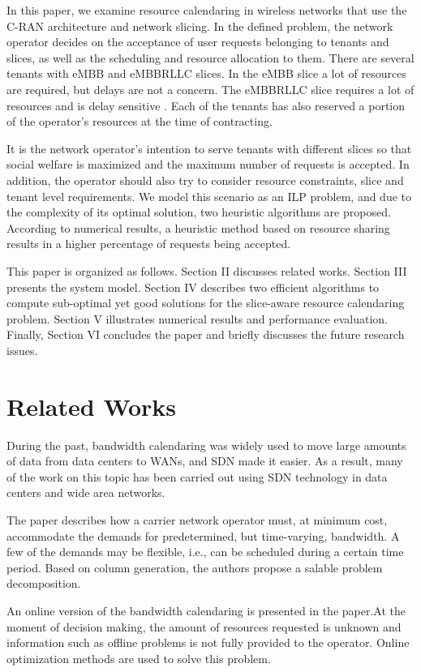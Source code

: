 \documentclass[conference]{IEEEtran}
\begin{document}
In this paper, we examine resource calendaring in wireless networks that use the C-RAN architecture and network slicing. In the defined problem, the network operator decides on the acceptance of user requests belonging to tenants and slices, as well as the scheduling and resource allocation to them. There are several tenants with eMBB and eMBBRLLC slices. In the eMBB slice a lot of resources are required, but delays are not a concern. The eMBBRLLC slice requires a lot of resources and is delay sensitive \cite{yazar20206g}. Each of the tenants has also reserved a portion of the operator's resources at the time of contracting.

It is the network operator's intention to serve tenants with different slices so that social welfare is maximized and the maximum number of requests is accepted. In addition, the operator should also try to consider resource constraints, slice and tenant level requirements. We model this scenario as an ILP problem, and due to the complexity of its optimal solution, two heuristic algorithms are proposed. According to numerical results, a heuristic method based on resource sharing results in a higher percentage of requests being accepted. 

This paper is organized as follows. Section II discusses related works. Section III presents the system model. Section IV describes two efficient algorithms to compute sub-optimal yet good solutions for the slice-aware resource calendaring problem. Section V illustrates numerical results and performance evaluation. Finally, Section VI concludes the paper and briefly discusses the future research issues.

\section{Related Works}
During the past, bandwidth calendaring was widely used to move large amounts of data from data centers to WANs, and SDN made it easier. As a result, many of the work on this topic has been carried out using SDN technology in data centers and wide area networks.

The paper \cite{gkatzikis2016bandwidth} describes how a carrier network operator must, at minimum cost, accommodate the demands for predetermined, but time-varying, bandwidth. A few of the demands may be flexible, i.e., can be scheduled during a certain time period. Based on column generation, the authors propose a salable problem decomposition. 

An online version of the bandwidth calendaring is presented in the  paper\cite{dufour2017online}.At the moment of decision making, the amount of resources requested is unknown and information such as offline problems is not fully provided to the operator. Online optimization methods are used to solve this problem.
\end{document}
